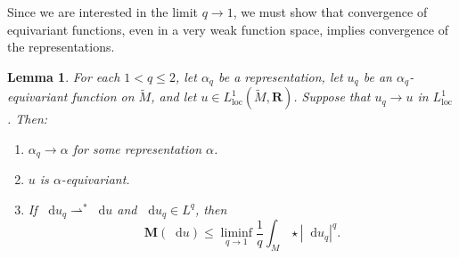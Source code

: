 \documentclass[reqno,11pt]{amsart}
\newcommand{\RR}{\mathbf{R}}
\newcommand*\dif{\mathop{}\!\mathrm{d}}
\newcommand{\weakto}{\rightharpoonup}
\newcommand{\Mass}{\mathbf M}
\newcommand{\loc}{\mathrm{loc}}
\newtheorem{lemma}[theorem]{Lemma}
\theoremstyle{definition}
\numberwithin{equation}{section}
\begin{document}
Since we are interested in the limit $q \to 1$, we must show that convergence of equivariant functions, even in a very weak function space, implies convergence of the representations.

\begin{lemma}\label{L1 convergence preserves pi1}
For each $1 < q \leq 2$, let $\alpha_q$ be a representation, let $u_q$ be an $\alpha_q$-equivariant function on $\tilde M$, and let $u \in L^1_\loc(\tilde M, \RR)$.
Suppose that $u_q \to u$ in $L^1_\loc$.
Then:
\begin{enumerate}
\item $\alpha_q \to \alpha$ for some representation $\alpha$.
\item $u$ is $\alpha$-equivariant.
\item If $\dif u_q \weakto^* \dif u$ and $\dif u_q \in L^q$, then
\begin{equation}\label{q to 1 Holder}
\Mass(\dif u) \leq \liminf_{q \to 1} \frac{1}{q} \int_M \star |\dif u_q|^q.
\end{equation}
\end{enumerate}
\end{lemma}
\end{document}

